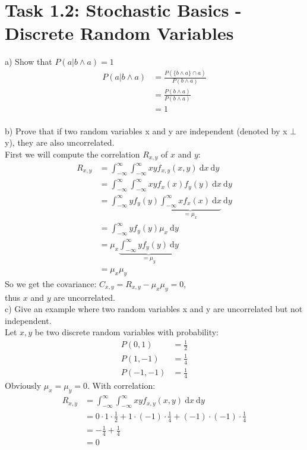 \documentclass[a4paper,footsepline]{scrartcl}
\begin{document}
	\section*{Task 1.2: Stochastic Basics - Discrete Random Variables}
	a) Show that $P(a | b \land a) = 1$
	\begin{align*}
	P(a | b \land a) & = \frac{P(\{b \land a\} \cap a)}{P(b \land a)}\\
	& = \frac{P(b \land a)}{P(b \land a)}\\
	& = 1
	\end{align*}
	\vspace{0.4cm}\\
	b) Prove that if two random variables x and y are independent (denoted by x $\bot$ y), they are
	also uncorrelated.
	\vspace{0.1cm}\\
	First we will compute the correlation $R_{x,y}$ of $x$ and $y$:
	\begin{align*}
		R_{x,y} &= \int_{-\infty}^{\infty} \int_{-\infty}^{\infty}  x y f_{x,y}(x,y)\ \text{d} x\ \text{d} y\\
		&= \int_{-\infty}^{\infty} \int_{-\infty}^{\infty}  x y f_x(x) f_y(y)\ \text{d} x\ \text{d} y\\
		&= \int_{-\infty}^{\infty} y f_y(y) \underbrace{ \int_{-\infty}^{\infty}  x f_x(x) \ \text{d} x}_{= \mu_x} \ \text{d} y\\
		&= \int_{-\infty}^{\infty} y f_y(y)\mu_x\ \text{d} y\\
		&= \mu_x \underbrace{\int_{-\infty}^{\infty} y f_y(y)\ \text{d} y}_{= \mu_y}\\
		&= \mu_x \mu_y
	\end{align*}
	So we get the covariance: $C_{x,y} = R_{x,y} - \mu_x \mu_y =0$, \\
	 thus  $x$ and $y$ are uncorrelated.
	 \vspace{0.4cm}\\
	c) Give an example where two random variables x and y are uncorrelated but not independent.
	\vspace{0.1cm}\\
	Let $x,y$ be two discrete random variables with probability: 
	\begin{align*}
		P(0,1) &= \frac{1}{2}\\
		P(1,-1) &= \frac{1}{4}\\
		P(-1,-1) &= \frac{1}{4}
	\end{align*}
	Obviously $\mu_x = \mu_y = 0$.
	With correlation:
	\begin{align*}
	R_{x,y} &= \int_{-\infty}^{\infty} \int_{-\infty}^{\infty}  x y f_{x,y}(x,y)\ \text{d} x\ \text{d} y\\
	&= 0 \cdot 1 \cdot \frac{1}{2} + 1 \cdot (-1) \cdot \frac{1}{4} + (-1) \cdot (-1) \cdot \frac{1}{4}\\
	&= - \frac{1}{4} +  \frac{1}{4}\\
	&= 0
	\end{align*}
\end{document}
